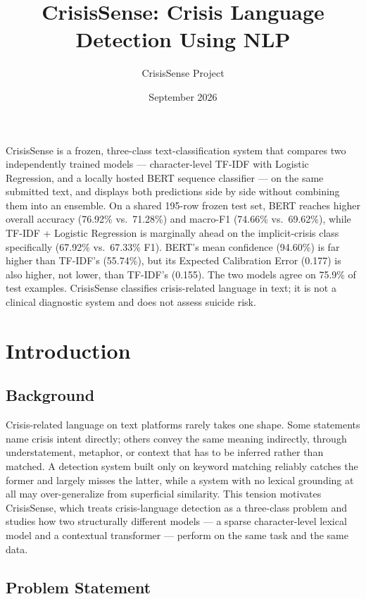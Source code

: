 \documentclass[12pt,a4paper]{article}
\title{\textbf{CrisisSense: Crisis Language Detection Using NLP}}
\author{CrisisSense Project}
\date{September 2026}
\begin{document}
\maketitle
\vspace{-0.4cm}

\noindent CrisisSense is a frozen, three-class text-classification system that compares two independently trained models --- character-level TF-IDF with Logistic Regression, and a locally hosted BERT sequence classifier --- on the same submitted text, and displays both predictions side by side without combining them into an ensemble. On a shared 195-row frozen test set, BERT reaches higher overall accuracy (76.92\% vs.\ 71.28\%) and macro-F1 (74.66\% vs.\ 69.62\%), while TF-IDF + Logistic Regression is marginally ahead on the implicit-crisis class specifically (67.92\% vs.\ 67.33\% F1). BERT's mean confidence (94.60\%) is far higher than TF-IDF's (55.74\%), but its Expected Calibration Error (0.177) is also higher, not lower, than TF-IDF's (0.155). The two models agree on 75.9\% of test examples. CrisisSense classifies crisis-related language in text; it is not a clinical diagnostic system and does not assess suicide risk.

\section{Introduction}

\subsection{Background}

Crisis-related language on text platforms rarely takes one shape. Some statements name crisis intent directly; others convey the same meaning indirectly, through understatement, metaphor, or context that has to be inferred rather than matched. A detection system built only on keyword matching reliably catches the former and largely misses the latter, while a system with no lexical grounding at all may over-generalize from superficial similarity. This tension motivates CrisisSense, which treats crisis-language detection as a three-class problem and studies how two structurally different models --- a sparse character-level lexical model and a contextual transformer --- perform on the same task and the same data.

\subsection{Problem Statement}
\end{document}
